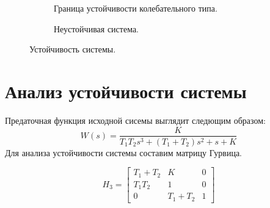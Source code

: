 \documentclass[a4paper, 11pt]{article}
\begin{document}
\begin{figure}[h!]
    \begin{subfigure}[b]{0.5\textwidth} 
        \centering
        \caption{Граница устойчивости колебательного типа.}
    \end{subfigure}
    \begin{subfigure}[b]{0.5\textwidth} 
        \centering
       \caption{Неустойчивая система.}
    \end{subfigure}
    \caption{Устойчивость системы.}
\end{figure}

\section*{Анализ устойчивости системы}
Предаточная функция исходной сисемы выглядит следющим образом:
\begin{equation}
    W(s) = \frac{K}{T_1 T_2 s^3 + (T_1 + T_2)s^2 + s + K}
\end{equation}
Для анализа устойчивости системы составим матрицу Гурвица.

\begin{equation}
    H_3 = \begin{bmatrix}
        T_1 + T_2 &  K & 0 \\
        T_1 T_2 & 1 & 0 \\
        0 & T_1 + T_2 & 1
    \end{bmatrix}
\end{equation}
\end{document}
